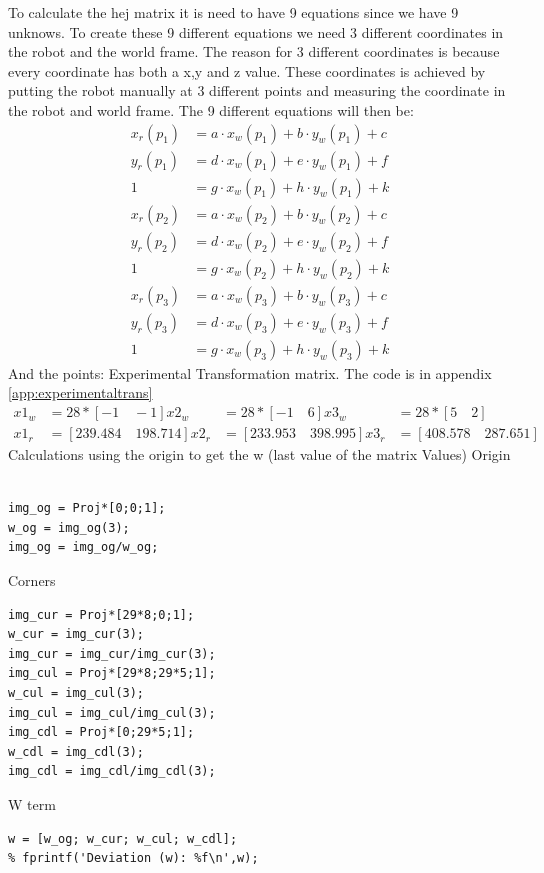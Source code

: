 To calculate the hej matrix it is need to have 9 equations since we have 9 unknows. To create these 9 different equations we need 3 different coordinates in the robot and the world frame. The reason for 3 different coordinates is because every coordinate has both a x,y and z value. These coordinates is achieved by putting the robot manually at 3 different points and measuring the coordinate in the robot and world frame. The 9 different equations will then be:
\begin{align*} 
x_r(p_1) &= a\cdot x_w(p_1) + b\cdot y_w(p_1) + c \\
y_r(p_1) &= d\cdot x_w(p_1) + e\cdot y_w(p_1) + f \\
1 &= g\cdot x_w(p_1) + h\cdot y_w(p_1) + k \\
x_r(p_2) &= a\cdot x_w(p_2) + b\cdot y_w(p_2) + c\\
y_r(p_2) &= d\cdot x_w(p_2) + e\cdot y_w(p_2) + f \\
1 &= g\cdot x_w(p_2) + h\cdot y_w(p_2) + k \\
x_r(p_3) &= a\cdot x_w(p_3) + b\cdot y_w(p_3) + c \\
y_r(p_3) &= d\cdot x_w(p_3) + e\cdot y_w(p_3) + f \\
1 &= g\cdot x_w(p_3) + h\cdot y_w(p_3) + k
\end{align*}
And the points:
Experimental Transformation matrix. The code is in appendix \ref{app:experimentaltrans}
\begin{align*}
x1_w&=28*[-1\quad -1] x2_w&=28*[-1\quad 6]  x3_w&=28*[5\quad 2]\\
x1_r&=[239.484\quad 198.714] x2_r&=[233.953\quad 398.995]   x3_r&=[408.578\quad 287.651]
\end{align*}
Calculations using the origin to get the w (last value of the matrix Values)
Origin
\begin{lstlisting}

img_og = Proj*[0;0;1];
w_og = img_og(3);
img_og = img_og/w_og;
\end{lstlisting}
Corners
\begin{lstlisting}
img_cur = Proj*[29*8;0;1];
w_cur = img_cur(3);
img_cur = img_cur/img_cur(3);
img_cul = Proj*[29*8;29*5;1];
w_cul = img_cul(3);
img_cul = img_cul/img_cul(3);
img_cdl = Proj*[0;29*5;1];
w_cdl = img_cdl(3);
img_cdl = img_cdl/img_cdl(3);
\end{lstlisting}
W term
\begin{lstlisting}
w = [w_og; w_cur; w_cul; w_cdl];
% fprintf('Deviation (w): %f\n',w);
\end{lstlisting}




















